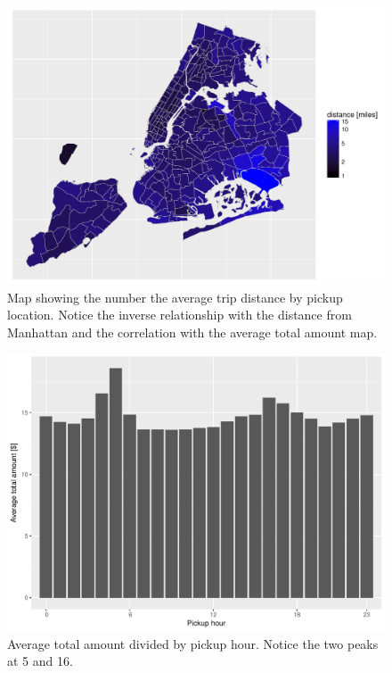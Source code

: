 \documentclass{acm_proc_article-sp-sigmod09}
\begin{document}
\begin{figure}
	\centering
	\includegraphics[width=1\columnwidth]{resources/base_plots/avg_distance_by_pickup_location_map.pdf}
	\caption{Map showing the number the average trip distance by pickup location. Notice the inverse relationship with the distance from Manhattan and the correlation with the average total amount map.}
	\label{fig:distanceMap}
\end{figure}

\begin{figure}
	\centering
	\includegraphics[width=1\columnwidth]{resources/base_plots/avg_total_amount_by_pickup_hour.pdf}
	\caption{Average total amount divided by pickup hour. Notice the two peaks at 5 and 16.}
	\label{fig:totalAmountByHour}
\end{figure}
\end{document}
